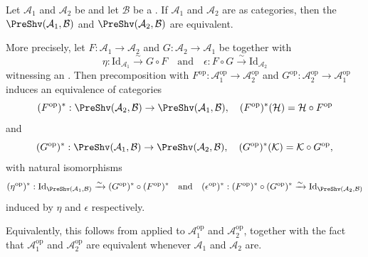 \begin{lemma} \label{lemma:equivalence_of_presheaf_categories_under_equivalent_source_categories}
Let $\mathcal{A}_1$ and $\mathcal{A}_2$ be  and let $\mathcal{B}$ be a . If $\mathcal{A}_1$ and $\mathcal{A}_2$ are  as categories, then the  $\PreShv(\mathcal{A}_1, \mathcal{B})$ and $\PreShv(\mathcal{A}_2, \mathcal{B})$ are equivalent.

More precisely, let $F: \mathcal{A}_1 \to \mathcal{A}_2$ and $G: \mathcal{A}_2 \to \mathcal{A}_1$ be  together with 
$$\eta: \mathrm{Id}_{\mathcal{A}_1} \xrightarrow{\sim} G \circ F \quad \text{and} \quad \epsilon: F \circ G \xrightarrow{\sim} \mathrm{Id}_{\mathcal{A}_2}$$
witnessing an . Then precomposition with $F^{\mathrm{op}}: \mathcal{A}_1^{\mathrm{op}} \to \mathcal{A}_2^{\mathrm{op}}$ and $G^{\mathrm{op}}: \mathcal{A}_2^{\mathrm{op}} \to \mathcal{A}_1^{\mathrm{op}}$ induces an equivalence of categories
$$(F^{\mathrm{op}})^*: \PreShv(\mathcal{A}_2, \mathcal{B}) \to \PreShv(\mathcal{A}_1, \mathcal{B}), \quad (F^{\mathrm{op}})^*(\mathcal{H}) = \mathcal{H} \circ F^{\mathrm{op}}$$
and
$$(G^{\mathrm{op}})^*: \PreShv(\mathcal{A}_1, \mathcal{B}) \to \PreShv(\mathcal{A}_2, \mathcal{B}), \quad (G^{\mathrm{op}})^*(\mathcal{K}) = \mathcal{K} \circ G^{\mathrm{op}},$$
with natural isomorphisms
$$(\eta^{\mathrm{op}})^*: \mathrm{Id}_{\PreShv(\mathcal{A}_1, \mathcal{B})} \xrightarrow{\sim} (G^{\mathrm{op}})^* \circ (F^{\mathrm{op}})^* \quad \text{and} \quad (\epsilon^{\mathrm{op}})^*: (F^{\mathrm{op}})^* \circ (G^{\mathrm{op}})^* \xrightarrow{\sim} \mathrm{Id}_{\PreShv(\mathcal{A}_2, \mathcal{B})}$$
induced by $\eta$ and $\epsilon$ respectively.

Equivalently, this follows from  applied to $\mathcal{A}_1^{\mathrm{op}}$ and $\mathcal{A}_2^{\mathrm{op}}$, together with the fact that $\mathcal{A}_1^{\mathrm{op}}$ and $\mathcal{A}_2^{\mathrm{op}}$ are equivalent whenever $\mathcal{A}_1$ and $\mathcal{A}_2$ are.
\end{lemma}